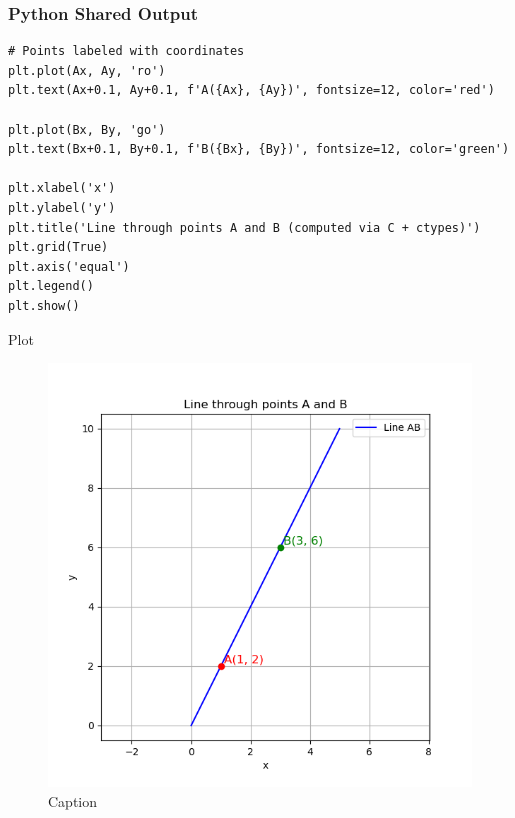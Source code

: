 \documentclass{beamer}
\begin{document}
\begin{frame}[fragile]
    \frametitle{Python Shared Output}
    \begin{lstlisting}
# Points labeled with coordinates
plt.plot(Ax, Ay, 'ro')
plt.text(Ax+0.1, Ay+0.1, f'A({Ax}, {Ay})', fontsize=12, color='red')

plt.plot(Bx, By, 'go')
plt.text(Bx+0.1, By+0.1, f'B({Bx}, {By})', fontsize=12, color='green')

plt.xlabel('x')
plt.ylabel('y')
plt.title('Line through points A and B (computed via C + ctypes)')
plt.grid(True)
plt.axis('equal')
plt.legend()
plt.show()
 \end{lstlisting}
\end{frame}  
\begin{frame}{Plot}
    \begin{figure}
        \centering
        \includegraphics[width=0.5\linewidth]{figs/fig1.png}
        \caption{Caption}
        \label{fig:placeholder}
    \end{figure}
\end{frame}
\end{document}
